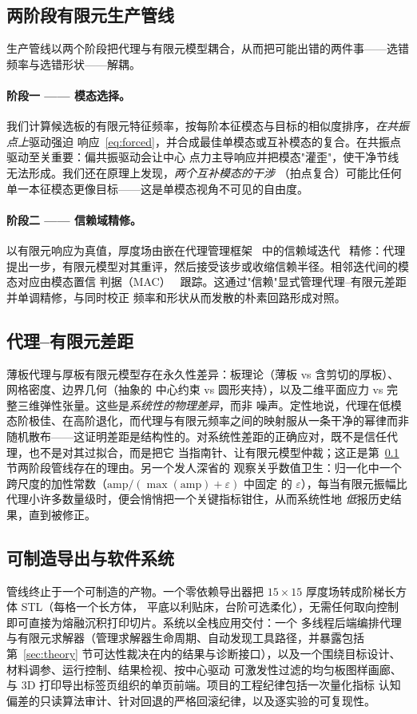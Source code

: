 \documentclass[11pt,a4paper]{article}
\begin{document}
\subsection{两阶段有限元生产管线}\label{sec:pipeline}
生产管线以两个阶段把代理与有限元模型耦合，从而把可能出错的两件事------选错频率与选错形状------解耦。

\paragraph{阶段一 ------ 模态选择。}
我们计算候选板的有限元特征频率，按每阶本征模态与目标的相似度排序，\emph{在共振点上}驱动强迫
响应~\eqref{eq:forced}，并合成最佳单模态或互补模态的复合。在共振点驱动至关重要：偏共振驱动会让中心
点力主导响应并把模态"灌歪"，使干净节线无法形成。我们还在原理上发现，\emph{两个互补模态的干涉}
（拍点复合）可能比任何单一本征模态更像目标------这是单模态视角不可见的自由度。

\paragraph{阶段二 ------ 信赖域精修。}
以有限元响应为真值，厚度场由嵌在代理管理框架~\cite{booker1999} 中的信赖域迭代~\cite{conn2000}
精修：代理提出一步，有限元模型对其重评，然后接受该步或收缩信赖半径。相邻迭代间的模态对应由模态置信
判据（MAC）~\cite{allemang1982} 跟踪。这通过"信赖"显式管理代理--有限元差距并单调精修，与同时校正
频率和形状从而发散的朴素回路形成对照。

\subsection{代理--有限元差距}\label{sec:gap}
薄板代理与厚板有限元模型存在永久性差异：板理论（薄板 vs 含剪切的厚板）、网格密度、边界几何（抽象的
中心约束 vs 圆形夹持），以及二维平面应力 vs 完整三维弹性张量。这些是\emph{系统性的物理差异}，而非
噪声。定性地说，代理在低模态阶极佳、在高阶退化，而代理与有限元频率之间的映射服从一条干净的幂律而非
随机散布------这证明差距是结构性的。对系统性差距的正确应对，既不是信任代理，也不是对其过拟合，而是把它
当指南针、让有限元模型仲裁；这正是第~\ref{sec:pipeline} 节两阶段管线存在的理由。另一个发人深省的
观察关乎数值卫生：归一化中一个跨尺度的加性常数（$\text{amp}/(\max(\text{amp})+\varepsilon)$ 中固定
的 $\varepsilon$），每当有限元振幅比代理小许多数量级时，便会悄悄把一个关键指标钳住，从而系统性地
\emph{低}报历史结果，直到被修正。

\subsection{可制造导出与软件系统}\label{sec:software}
管线终止于一个可制造的产物。一个零依赖导出器把 $15\times15$ 厚度场转成阶梯长方体 STL（每格一个长方体，
平底以利贴床，台阶可选柔化），无需任何取向控制即可直接为熔融沉积打印切片。系统以全栈应用交付：一个
多线程后端编排代理与有限元求解器（管理求解器生命周期、自动发现工具路径，并暴露包括第~\ref{sec:theory}
节可达性裁决在内的结果与诊断接口），以及一个围绕目标设计、材料调参、运行控制、结果检视、按中心驱动
可激发性过滤的均匀板图样画廊、与 3D 打印导出标签页组织的单页前端。项目的工程纪律包括一次量化指标
认知偏差的只读算法审计、针对回退的严格回滚纪律，以及逐实验的可复现性。
\end{document}
